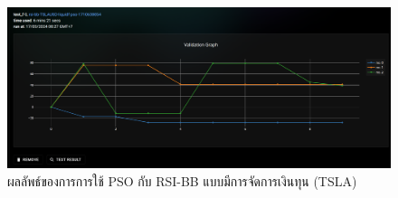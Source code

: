 \begin{figure}[ht]
    \centering
    \includegraphics[width=\textwidth]{images/pso/rsi-bb/tsla-liquid.png}
    \caption{ผลลัพธ์ของการการใช้ PSO กับ RSI-BB แบบมีการจัดการเงินทุน (TSLA)}
\end{figure}
